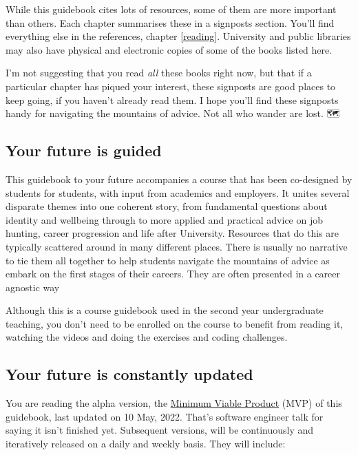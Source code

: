 \documentclass[
]{book}
\begin{document}
While this guidebook cites lots of resources, some of them are more important than others. Each chapter summarises these in a signposts section. You'll find everything else in the references, chapter \ref{reading}. University and public libraries may also have physical and electronic copies of some of the books listed here.

I'm not suggesting that you read \emph{all} these books right now, but that if a particular chapter has piqued your interest, these signposts are good places to keep going, if you haven't already read them. I hope you'll find these signposts handy for navigating the mountains of advice. Not all who wander are lost. 🗺️🧭

\hypertarget{study}{%
\subsection{Your future is guided}\label{study}}

This guidebook to your future accompanies a course that has been co-designed by students for students, with input from academics and employers. It unites several disparate themes into one coherent story, from fundamental questions about identity and wellbeing through to more applied and practical advice on job hunting, career progression and life after University. Resources that do this are typically scattered around in many different places. There is usually no narrative to tie them all together to help students navigate the mountains of advice as embark on the first stages of their careers. They are often presented in a career agnostic way

Although this is a course guidebook used in the second year undergraduate teaching, you don't need to be enrolled on the course to benefit from reading it, watching the videos and doing the exercises and coding challenges.

\hypertarget{version}{%
\subsection{Your future is constantly updated}\label{version}}

You are reading the alpha version, the \href{https://en.wikipedia.org/wiki/Minimum_viable_product}{Minimum Viable Product} (MVP) of this guidebook, last updated on 10 May, 2022. That's software engineer talk for saying it isn't finished yet. Subsequent versions, will be continuously and iteratively released on a daily and weekly basis. They will include:
\end{document}
